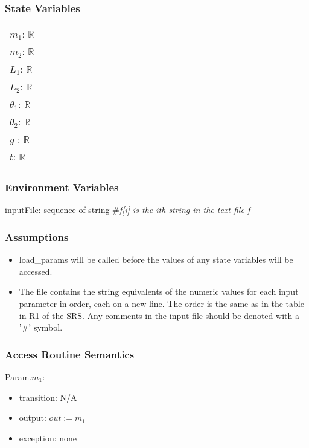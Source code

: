\documentclass[12pt, titlepage]{article}
\begin{document}
\subsubsection{State Variables}
\renewcommand{\arraystretch}{1.2}
\begin{longtable*}[l]{l} 

$m_1$: $\mathbb{R}$ \\
$m_2$: $\mathbb{R}$ \\
$L_1$: $\mathbb{R}$ \\
$L_2$: $\mathbb{R}$ \\
$\theta_1$: $\mathbb{R}$ \\
$\theta_2$: $\mathbb{R}$ \\
$g$ : $\mathbb{R}$ \\
$t$: $\mathbb{R}$ \\

\end{longtable*}

\subsubsection{Environment Variables}
inputFile: sequence of string \#\textit{f[i] is the ith string in the text file f}\\ 
\subsubsection{Assumptions}
\begin{itemize}
\item load\_params will be called before the values of any state variables will be accessed.

\item The file contains the string equivalents of the numeric values for
each input parameter in order, each on a new line. The order is the same as in
the table in R1 of the SRS. Any comments in the input file should be denoted
with a '\#' symbol.
\end{itemize}
\subsubsection{Access Routine Semantics}

\noindent Param.$m_1$:
\begin{itemize}
\item transition: N/A
\item output: $out := m_1$
\item exception: none
\end{itemize}
\end{document}
